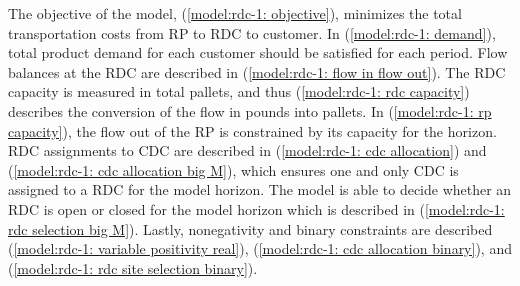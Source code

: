 \documentclass[12pt]{article}
\begin{document}
The objective of the model, (\ref{model:rdc-1: objective}), minimizes the total transportation costs from RP to RDC to customer.
In (\ref{model:rdc-1: demand}), total product demand for each customer should be satisfied for each period. Flow balances at the
RDC are described in (\ref{model:rdc-1: flow in flow out}). The RDC capacity is measured in total pallets, and thus
(\ref{model:rdc-1: rdc capacity}) describes the conversion of the flow in pounds into pallets. In (\ref{model:rdc-1: rp capacity}), the
flow out of the RP is constrained by its capacity for the horizon. RDC assignments to CDC are described
in (\ref{model:rdc-1: cdc allocation}) and (\ref{model:rdc-1: cdc allocation big M}), which ensures one and only CDC is assigned
to a RDC for the model horizon. The model is able to decide whether an RDC is open or closed for the model horizon
which is described in (\ref{model:rdc-1: rdc selection big M}). Lastly, nonegativity and binary constraints are described (\ref{model:rdc-1: variable positivity real}),
(\ref{model:rdc-1: cdc allocation binary}), and (\ref{model:rdc-1: rdc site selection binary}).
\end{document}
